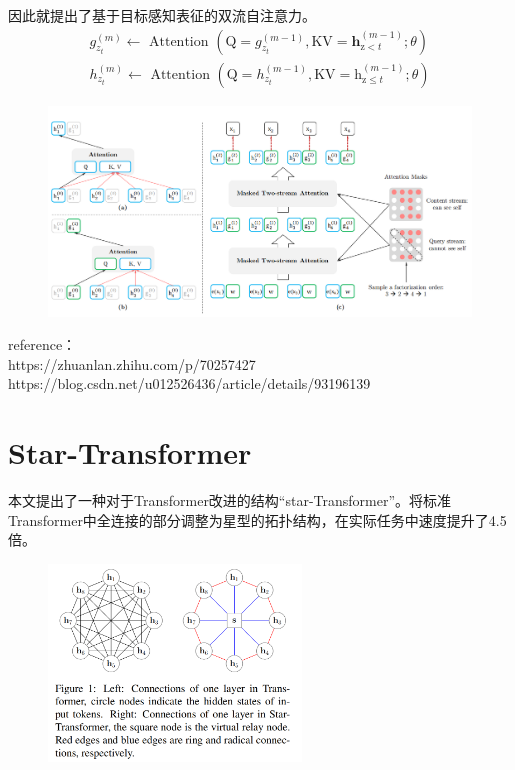 \documentclass[a4paper,UTF8]{article}
\numberwithin{equation}{section}
\begin{document}
因此就提出了基于目标感知表征的双流自注意力。
$$
\begin{array}{l}{g_{z_{t}}^{(m)} \leftarrow \text { Attention }\left(\mathrm{Q}=g_{z_{t}}^{(m-1)}, \mathrm{KV}=\mathbf{h}_{\mathrm{z}<t}^{(m-1)} ; \theta\right)} \\ {h_{z_{t}}^{(m)} \leftarrow \text { Attention }\left(\mathrm{Q}=h_{z_{t}}^{(m-1)}, \mathrm{KV}=\mathrm{h}_{\mathrm{z} \leq t}^{(m-1)} ; \theta\right)}\end{array}
$$
\begin{figure}[H]
	\centering
	\includegraphics[width=\textwidth]{5-2.png}
\end{figure}

reference：\\
https://zhuanlan.zhihu.com/p/70257427 \\
https://blog.csdn.net/u012526436/article/details/93196139


\newpage
\section{Star-Transformer}
本文提出了一种对于Transformer改进的结构“star-Transformer”。将标准Transformer中全连接的部分调整为星型的拓扑结构，在实际任务中速度提升了4.5倍。
\begin{figure}[H]
	\centering
	\includegraphics[width=0.6\textwidth]{6-1.png}
\end{figure}
\end{document}
